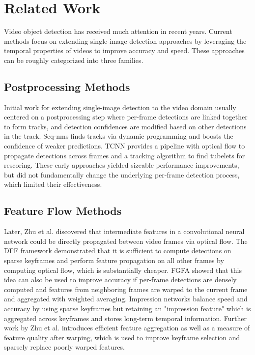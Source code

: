 \documentclass[10pt,twocolumn,letterpaper]{article}
\begin{document}
\section{Related Work}
Video object detection has received much attention in recent years. Current methods focus on extending single-image detection approaches by leveraging the temporal properties of videos to improve accuracy and speed. These approaches can be roughly categorized into three families.

\subsection{Postprocessing Methods}
Initial work for extending single-image detection to the video domain usually centered on a postprocessing step where per-frame detections are linked together to form tracks, and detection confidences are modified based on other detections in the track. Seq-nms \cite{HanW} finds tracks via dynamic programming and boosts the confidence of weaker predictions. TCNN \cite{KangK1, KangK2} provides a pipeline with optical flow to propagate detections across frames and a tracking algorithm to find tubelets for rescoring. These early approaches yielded sizeable performance improvements, but did not fundamentally change the underlying per-frame detection process, which limited their effectiveness.

\subsection{Feature Flow Methods}
Later, Zhu et al. \cite{ZhuX1} discovered that intermediate features in a convolutional neural network could be directly propagated between video frames via optical flow. The DFF framework \cite{ZhuX1} demonstrated that it is sufficient to compute detections on sparse keyframes and perform feature propagation on all other frames by computing optical flow, which is substantially cheaper. FGFA \cite{ZhuX2} showed that this idea can also be used to improve accuracy if per-frame detections are densely computed and features from neighboring frames are warped to the current frame and aggregated with weighted averaging. Impression networks \cite{hetang2017impression} balance speed and accuracy by using sparse keyframes but retaining an "impression feature" which is aggregated across keyframes and stores long-term temporal information. Further work by Zhu et al. \cite{zhu2018towards} introduces efficient feature aggregation as well as a measure of feature quality after warping, which is used to improve keyframe selection and sparsely replace poorly warped features. 
\end{document}
